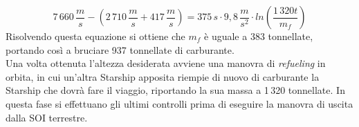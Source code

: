 $$
7\,660\,\frac{m}{s} - (2\,710\,\frac{m}{s} + 417\,\frac{m}{s})= 375\,s \cdot 9,8\,\frac{m}{s^2} \cdot ln\left(\frac{1\,320t}{m_f}\right)
$$
Risolvendo questa equazione si ottiene che $m_f$ è uguale a 383 tonnellate, portando così a bruciare 937 tonnellate di carburante.\\
Una volta ottenuta l'altezza desiderata avviene una manovra di \textit{refueling} in orbita, in cui un'altra Starship apposita riempie di nuovo di carburante la Starship che dovrà fare il viaggio, riportando la sua massa a 1\,320 tonnellate. In questa fase si effettuano gli ultimi controlli prima di eseguire la manovra di uscita dalla SOI terrestre.